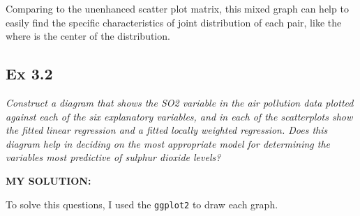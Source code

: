 \documentclass[
]{article}
\begin{document}
Comparing to the unenhanced scatter plot matrix, this mixed graph can
help to easily find the specific characteristics of joint distribution
of each pair, like the where is the center of the distribution.

\hypertarget{ex-3.2}{%
\subsection{Ex 3.2}\label{ex-3.2}}

\emph{Construct a diagram that shows the SO2 variable in the air
pollution data plotted against each of the six explanatory variables,
and in each of the scatterplots show the fitted linear regression and a
fitted locally weighted regression. Does this diagram help in deciding
on the most appropriate model for determining the variables most
predictive of sulphur dioxide levels?}

\textbf{MY SOLUTION:}

To solve this questions, I used the \texttt{ggplot2} to draw each graph.
\end{document}
